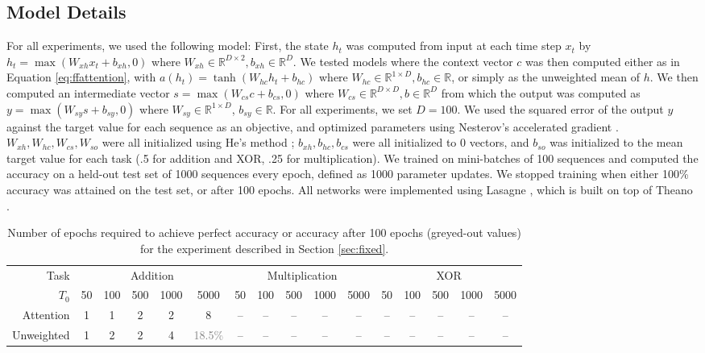 \documentclass{article} %
\begin{document}
\subsection{Model Details}

For all experiments, we used the following model:
First, the state $h_t$ was computed from input at each time step $x_t$ by $h_t = \max(W_{xh}x_t + b_{xh}, 0)$ where $W_{xh} \in \mathbb{R}^{D \times 2}, b_{xh} \in \mathbb{R}^D$.
We tested models where the context vector $c$ was then computed either as in Equation \ref{eq:ffattention}, with $a(h_t) =\tanh(W_{hc}h_t + b_{hc})$ where $W_{hc} \in \mathbb{R}^{1 \times D}, b_{hc} \in \mathbb{R}$, or simply as the unweighted mean of $h$.
We then computed an intermediate vector $s = \max(W_{cs}c + b_{cs}, 0)$ where $W_{cs} \in \mathbb{R}^{D \times D}, b \in \mathbb{R}^D$ from which the output was computed as $y = \max(W_{sy}s + b_{sy}, 0)$ where $W_{sy} \in \mathbb{R}^{1 \times D}$, $b_{sy} \in \mathbb{R}$.
For all experiments, we set $D = 100$.
We used the squared error of the output $y$ against the target value for each sequence as an objective, and optimized parameters using Nesterov's accelerated gradient \cite{sutskever2013importance}.
$W_{xh}, W_{hc}, W_{cs}, W_{so}$ were all initialized using He's method \cite{he2015delving}; $b_{xh}, b_{hc}, b_{cs}$ were all initialized to 0 vectors, and $b_{so}$ was initialized to the mean target value for each task (.5 for addition and XOR, .25 for multiplication).
We trained on mini-batches of 100 sequences and computed the accuracy on a held-out test set of 1000 sequences every epoch, defined as 1000 parameter updates.
We stopped training when either 100\% accuracy was attained on the test set, or after 100 epochs.
All networks were implemented using Lasagne \cite{dieleman2015lasagne}, which is built on top of Theano \cite{bastien2012theano,bergstra2010theano}.

\begin{table}
  \centering
  \scriptsize
  \begin{tabular}{r c c c c c c c c c c c c c c c}
    \toprule
    Task & \multicolumn{5}{c}{Addition} & \multicolumn{5}{c}{Multiplication} & \multicolumn{5}{c}{XOR} \\
    $T_0$ & 50 & 100 & 500 & 1000 & 5000 & 50 & 100 & 500 & 1000 & 5000 & 50 & 100 & 500 & 1000 & 5000 \\
    \cmidrule(r){2-6}
    \cmidrule(r){7-11}
    \cmidrule(r){12-16}
    Attention & 1 & 1 & 2 & 2 & 8 & -- & -- & -- & -- & -- & -- & -- & -- & -- & -- \\
    Unweighted & 1 & 2 & 2 & 4 & \textcolor{gray}{18.5\%} & -- & -- & -- & -- & -- & -- & -- & -- & -- & -- \\
    \bottomrule
  \end{tabular}
  \caption{Number of epochs required to achieve perfect accuracy or accuracy after 100 epochs (greyed-out values) for the experiment described in Section \ref{sec:fixed}.}
  \label{tab:fixed}
\end{table}
\setlength{\textfloatsep}{10pt}
\end{document}
